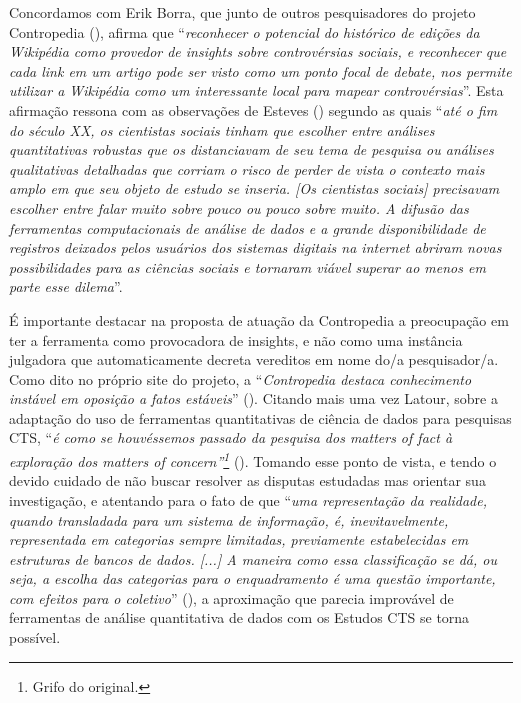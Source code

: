 Concordamos com Erik Borra, que junto de outros pesquisadores do projeto Contropedia (\citeyear[p.196]{noauthor_site_2013}), afirma que ``\textit{reconhecer o potencial do histórico de edições da Wikipédia como provedor de insights sobre controvérsias sociais, e reconhecer que cada link em um artigo pode ser visto como um ponto focal de debate, nos permite utilizar a Wikipédia como um interessante local para mapear controvérsias}''. Esta afirmação ressona com as observações de Esteves (\citeyear[p.295]{esteves_as_2014}) segundo as quais ``\textit{até o fim do século XX, os cientistas sociais tinham que escolher entre análises quantitativas robustas que os distanciavam de seu tema de pesquisa ou análises qualitativas detalhadas que corriam o risco de perder de vista o contexto mais amplo em que seu objeto de estudo se inseria. [Os cientistas sociais] precisavam escolher entre falar muito sobre pouco ou pouco sobre muito. A difusão das ferramentas computacionais de análise de dados e a grande disponibilidade de registros deixados pelos usuários dos sistemas digitais na internet abriram novas possibilidades para as ciências sociais e tornaram viável superar ao menos em parte esse dilema}''.

É importante destacar na proposta de atuação da Contropedia a preocupação em ter a ferramenta como provocadora de insights, e não como uma instância julgadora que automaticamente decreta vereditos em nome do/a pesquisador/a. Como dito no próprio site do projeto, a ``\textit{Contropedia destaca conhecimento instável em oposição a fatos estáveis}'' (\cite{noauthor_site_2013}). Citando mais uma vez Latour, sobre a adaptação do uso de ferramentas quantitativas de ciência de dados para pesquisas CTS, “\textit{é como se houvéssemos passado da pesquisa dos matters of fact à exploração dos matters of concern”\footnote{Grifo do original.}} (\cite[p.160]{latour_cogitamus_2010}). Tomando esse ponto de vista, e tendo o devido cuidado de não buscar resolver as disputas estudadas mas orientar sua investigação, e atentando para o fato de que ``\textit{uma representação da realidade, quando transladada para um sistema de informação, é, inevitavelmente, representada em categorias sempre limitadas, previamente estabelecidas em estruturas de bancos de dados. [...] A maneira como essa classificação se dá, ou seja, a escolha das categorias para o enquadramento é uma questão importante, com efeitos para o coletivo}'' (\cite[p.8]{feitosa_cidadao_2010}), a aproximação que parecia improvável de ferramentas de análise quantitativa de dados com os Estudos CTS se torna possível.
